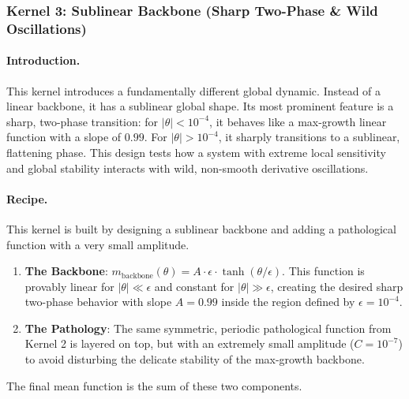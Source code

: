 \documentclass[a4paper]{article}
\begin{document}
\subsubsection*{Kernel 3: Sublinear Backbone (Sharp Two-Phase \& Wild Oscillations)}
\paragraph{Introduction.}
This kernel introduces a fundamentally different global dynamic. Instead of a linear backbone, it has a sublinear global shape. Its most prominent feature is a sharp, two-phase transition: for $|\theta| < 10^{-4}$, it behaves like a max-growth linear function with a slope of $0.99$. For $|\theta| > 10^{-4}$, it sharply transitions to a sublinear, flattening phase. This design tests how a system with extreme local sensitivity and global stability interacts with wild, non-smooth derivative oscillations.

\paragraph{Recipe.}
This kernel is built by designing a sublinear backbone and adding a pathological function with a very small amplitude.
\begin{enumerate}
	\item \textbf{The Backbone}: $m_{\text{backbone}}(\theta) = A \cdot \epsilon \cdot \tanh(\theta/\epsilon)$. This function is provably linear for $|\theta| \ll \epsilon$ and constant for $|\theta| \gg \epsilon$, creating the desired sharp two-phase behavior with slope $A=0.99$ inside the region defined by $\epsilon=10^{-4}$.
	\item \textbf{The Pathology}: The same symmetric, periodic pathological function from Kernel 2 is layered on top, but with an extremely small amplitude ($C=10^{-7}$) to avoid disturbing the delicate stability of the max-growth backbone.
\end{enumerate}
The final mean function is the sum of these two components.
\end{document}
